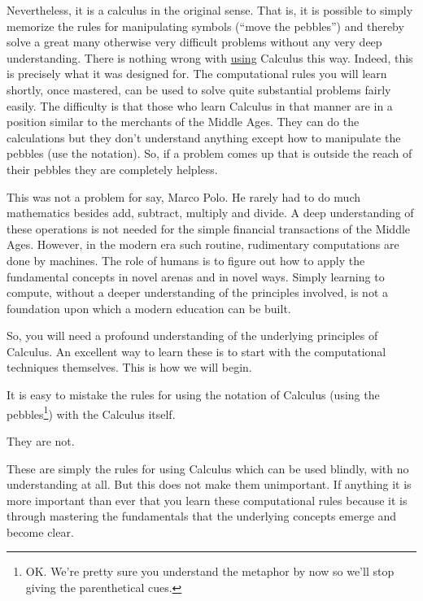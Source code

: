   Nevertheless, it is a calculus in the original sense. That is, it is
  possible to simply memorize the rules for manipulating symbols
  (``move the pebbles'') and thereby solve a great many otherwise very
  difficult problems without any very deep understanding. There is
  nothing wrong with \underline{using} Calculus this way. Indeed, this
  is precisely what it was designed for. The computational rules you
  will learn shortly, once mastered, can be used to solve quite
  substantial problems fairly easily. The difficulty is that those who
  learn Calculus in that manner are in a position similar to the
  merchants of the Middle Ages. They can do the calculations but they
  don't understand anything except how to manipulate the pebbles (use
  the notation). So, if a problem comes up that is outside the reach
  of their pebbles they are completely helpless.



  This was not a problem for say, Marco Polo. He rarely had to do
  much mathematics besides add, subtract, multiply and divide. A deep
  understanding of these operations is not needed for the simple
  financial transactions of the Middle Ages. However, in the modern
  era such routine, rudimentary computations are done by machines. The
  role of humans is to figure out how to apply the fundamental
  concepts in novel arenas and in novel ways. Simply learning to
  compute, without a deeper understanding of the principles involved,
  is not a foundation upon which a modern education can be built.

  So, you will need a profound understanding of the underlying
  principles of Calculus.  An excellent way to learn these is to start
  with the computational techniques themselves. This is how we will
  begin.

  It is easy to mistake the rules for using the notation of Calculus
  (using the pebbles\footnote{OK. We're pretty sure you understand the
    metaphor by now so we'll stop giving the parenthetical cues.})
  with the Calculus itself.

  They are not.

  These are simply the rules for using Calculus which can be used
  blindly, with no understanding at all.
  But this does not make them unimportant. If anything it is more
  important than ever that you learn these computational rules because
  it is through mastering the fundamentals that the underlying
  concepts emerge and become clear.

